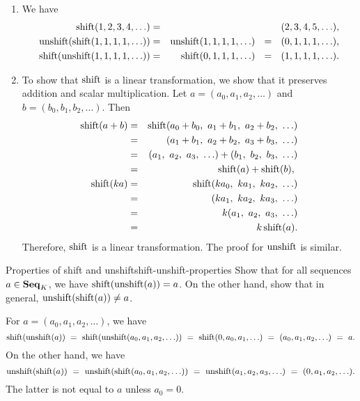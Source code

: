 \begin{solution}
  \begin{enumialphparenastyle}
    \begin{enumerate}
    \item We have
      \begin{eqnarray*}
        \shift(1,2,3,4,\ldots)
        &=& (2,3,4,5,\ldots), \\
        \unshift(\shift(1,1,1,1,\ldots))
        &=& \unshift(1,1,1,1,\ldots)
        ~~=~~ (0,1,1,1,\ldots), \\
        \shift(\unshift(1,1,1,1,\ldots))
        &=& \shift(0,1,1,1,\ldots)
        ~~=~~ (1,1,1,1,\ldots).
      \end{eqnarray*}
    \item To show that $\shift$ is a linear transformation, we show
      that it preserves addition and scalar multiplication. Let
      $a=(a_0,a_1,a_2,\ldots)$ and $b=(b_0,b_1,b_2,\ldots)$. Then
      \begin{eqnarray*}
        \shift(a+b) &=& \shift(a_0+b_0,~a_1+b_1,~a_2+b_2,~\ldots) \\
                    &=& (a_1+b_1,~a_2+b_2,~a_3+b_3,~\ldots) \\
                    &=& (a_1,~a_2,~a_3,~\ldots) + (b_1,~b_2,~b_3,~\ldots) \\
                    &=& \shift(a) + \shift(b),~ \\
        \shift(ka)  &=& \shift(ka_0,~ka_1,~ka_2,~\ldots) \\
                    &=& (ka_1,~ka_2,~ka_3,~\ldots) \\
                    &=& k(a_1,~a_2,~a_3,~\ldots) \\
                    &=& k\shift(a). \\
      \end{eqnarray*}
      Therefore, $\shift$ is a linear transformation. The proof for
      $\unshift$ is similar.
    \end{enumerate}
  \end{enumialphparenastyle}
\end{solution}

\begin{example}{Properties of shift and unshift}{shift-unshift-properties}
  Show that for all sequences $a\in\mathbf{Seq}_K$, we have
  $\shift(\unshift(a))=a$. On the other hand, show that in general,
  $\unshift(\shift(a))\neq a$.
\end{example}

\begin{solution}
  For $a=(a_0,a_1,a_2,\ldots)$, we have
  \begin{equation*}
    \shift(\unshift(a))
    ~=~ \shift(\unshift(a_0,a_1,a_2,\ldots))
    ~=~ \shift(0,a_0,a_1,\ldots)
    ~=~ (a_0,a_1,a_2,\ldots)
    ~=~ a.
  \end{equation*}
  On the other hand, we have
  \begin{equation*}
    \unshift(\shift(a))
    ~=~ \unshift(\shift(a_0,a_1,a_2,\ldots))
    ~=~ \unshift(a_1,a_2,a_3,\ldots)
    ~=~ (0,a_1,a_2,\ldots).
  \end{equation*}
  The latter is not equal to $a$ unless $a_0=0$.
\end{solution}

